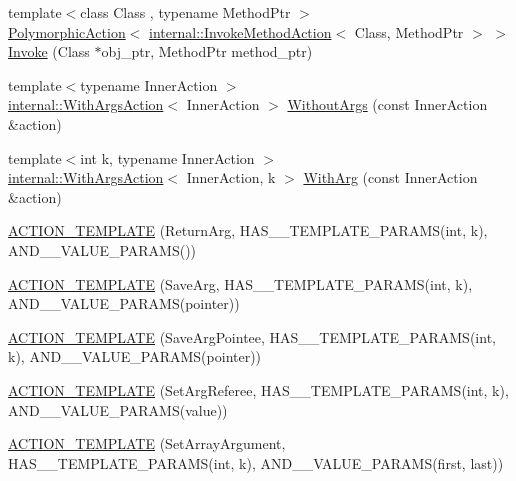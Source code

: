 \begin{DoxyCompactItemize}
\item 
{\footnotesize template$<$class Class , typename Method\+Ptr $>$ }\\\mbox{\hyperlink{classtesting_1_1PolymorphicAction}{Polymorphic\+Action}}$<$ \mbox{\hyperlink{classtesting_1_1internal_1_1InvokeMethodAction}{internal\+::\+Invoke\+Method\+Action}}$<$ Class, Method\+Ptr $>$ $>$ \mbox{\hyperlink{namespacetesting_a80b82dc382445d240ff011f9c34aefc4}{Invoke}} (Class $\ast$obj\+\_\+ptr, Method\+Ptr method\+\_\+ptr)
\item 
{\footnotesize template$<$typename Inner\+Action $>$ }\\\mbox{\hyperlink{classtesting_1_1internal_1_1WithArgsAction}{internal\+::\+With\+Args\+Action}}$<$ Inner\+Action $>$ \mbox{\hyperlink{namespacetesting_aeac85f74bd11112f69142e92e3a50780}{Without\+Args}} (const Inner\+Action \&action)
\item 
{\footnotesize template$<$int k, typename Inner\+Action $>$ }\\\mbox{\hyperlink{classtesting_1_1internal_1_1WithArgsAction}{internal\+::\+With\+Args\+Action}}$<$ Inner\+Action, k $>$ \mbox{\hyperlink{namespacetesting_af76590c6cecc621e1ab4b681a9ea209b}{With\+Arg}} (const Inner\+Action \&action)
\item 
\mbox{\hyperlink{namespacetesting_a109d48f969260878ed1e743006196992}{A\+C\+T\+I\+O\+N\+\_\+\+T\+E\+M\+P\+L\+A\+TE}} (Return\+Arg, H\+A\+S\+\_\+\_\+\+T\+E\+M\+P\+L\+A\+T\+E\+\_\+\+P\+A\+R\+A\+MS(int, k), A\+N\+D\+\_\+\_\+\+V\+A\+L\+U\+E\+\_\+\+P\+A\+R\+A\+MS())
\item 
\mbox{\hyperlink{namespacetesting_a0478a3464d31f6726d5bc47b1be46491}{A\+C\+T\+I\+O\+N\+\_\+\+T\+E\+M\+P\+L\+A\+TE}} (Save\+Arg, H\+A\+S\+\_\+\_\+\+T\+E\+M\+P\+L\+A\+T\+E\+\_\+\+P\+A\+R\+A\+MS(int, k), A\+N\+D\+\_\+\_\+\+V\+A\+L\+U\+E\+\_\+\+P\+A\+R\+A\+MS(pointer))
\item 
\mbox{\hyperlink{namespacetesting_a31565a90ad7f08c1a88e4b138957172c}{A\+C\+T\+I\+O\+N\+\_\+\+T\+E\+M\+P\+L\+A\+TE}} (Save\+Arg\+Pointee, H\+A\+S\+\_\+\_\+\+T\+E\+M\+P\+L\+A\+T\+E\+\_\+\+P\+A\+R\+A\+MS(int, k), A\+N\+D\+\_\+\_\+\+V\+A\+L\+U\+E\+\_\+\+P\+A\+R\+A\+MS(pointer))
\item 
\mbox{\hyperlink{namespacetesting_adfd3c9538285d257370f955aa81488f1}{A\+C\+T\+I\+O\+N\+\_\+\+T\+E\+M\+P\+L\+A\+TE}} (Set\+Arg\+Referee, H\+A\+S\+\_\+\_\+\+T\+E\+M\+P\+L\+A\+T\+E\+\_\+\+P\+A\+R\+A\+MS(int, k), A\+N\+D\+\_\+\_\+\+V\+A\+L\+U\+E\+\_\+\+P\+A\+R\+A\+MS(value))
\item 
\mbox{\hyperlink{namespacetesting_a2b0f090219db3bb0630d5ce6f7d911d8}{A\+C\+T\+I\+O\+N\+\_\+\+T\+E\+M\+P\+L\+A\+TE}} (Set\+Array\+Argument, H\+A\+S\+\_\+\_\+\+T\+E\+M\+P\+L\+A\+T\+E\+\_\+\+P\+A\+R\+A\+MS(int, k), A\+N\+D\+\_\+\_\+\+V\+A\+L\+U\+E\+\_\+\+P\+A\+R\+A\+MS(first, last))

\end{DoxyCompactItemize}

